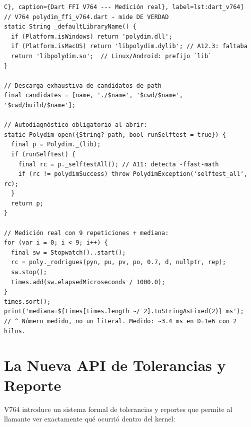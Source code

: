 \begin{verbatim}C}, caption={Dart FFI V764 --- Medición real}, label=lst:dart_v764]
// V764 polydim_ffi_v764.dart - mide DE VERDAD
static String _defaultLibraryName() {
  if (Platform.isWindows) return 'polydim.dll';
  if (Platform.isMacOS) return 'libpolydim.dylib'; // A12.3: faltaba
  return 'libpolydim.so';  // Linux/Android: prefijo `lib`
}

// Descarga exhaustiva de candidatos de path
final candidates = [name, './$name', '$cwd/$name', '$cwd/build/$name'];

// Autodiagnóstico obligatorio al abrir:
static Polydim open({String? path, bool runSelftest = true}) {
  final p = Polydim._(lib);
  if (runSelftest) {
    final rc = p._selftestAll(); // A11: detecta -ffast-math
    if (rc != polydimSuccess) throw PolydimException('selftest_all', rc);
  }
  return p;
}

// Medición real con 9 repeticiones + mediana:
for (var i = 0; i < 9; i++) {
  final sw = Stopwatch()..start();
  rc = poly._rodrigues(pyn, pu, pv, po, 0.7, d, nullptr, rep);
  sw.stop();
  times.add(sw.elapsedMicroseconds / 1000.0);
}
times.sort();
print('mediana=${times[times.length ~/ 2].toStringAsFixed(2)} ms');
// ^ Número medido, no un literal. Medido: ~3.4 ms en D=1e6 con 2 hilos.
\end{verbatim}

\section{La Nueva API de Tolerancias y Reporte}

V764 introduce un sistema formal de tolerancias y reportes que permite al llamante
ver exactamente qué ocurrió dentro del kernel:

